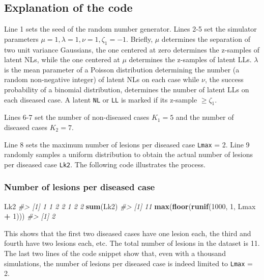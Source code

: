 \documentclass[
]{book}
\newenvironment{Shaded}{\begin{snugshade}}{\end{snugshade}}
\newcommand{\CommentTok}[1]{\textcolor[rgb]{0.56,0.35,0.01}{\textit{#1}}}
\newcommand{\DecValTok}[1]{\textcolor[rgb]{0.00,0.00,0.81}{#1}}
\newcommand{\KeywordTok}[1]{\textcolor[rgb]{0.13,0.29,0.53}{\textbf{#1}}}
\newcommand{\NormalTok}[1]{#1}
\newcommand{\OperatorTok}[1]{\textcolor[rgb]{0.81,0.36,0.00}{\textbf{#1}}}
\newcommand{\StringTok}[1]{\textcolor[rgb]{0.31,0.60,0.02}{#1}}
\begin{document}
\hypertarget{explanation-of-the-code}{%
\subsection{Explanation of the code}\label{explanation-of-the-code}}

Line 1 sets the seed of the random number generator. Lines 2-5 set the simulator parameters \(\mu = 1, \lambda = 1, \nu = 1, \zeta_1 = -1\). Briefly, \(\mu\) determines the separation of two unit variance Gaussians, the one centered at zero determines the z-samples of latent NLs, while the one centered at \(\mu\) determines the z-samples of latent LLs. \(\lambda\) is the mean parameter of a Poisson distribution determining the number (a random non-negative integer) of latent NLs on each case while \(\nu\), the success probability of a binomial distribution, determines the number of latent LLs on each diseased case. A latent \texttt{NL} or \texttt{LL} is marked if its z-sample \(\geq \zeta_1\).

Lines 6-7 set the number of non-diseased cases \(K_1 = 5\) and the number of diseased cases \(K_2 = 7\).

Line 8 sets the maximum number of lesions per diseased case \texttt{Lmax} = 2. Line 9 randomly samples a uniform distribution to obtain the actual number of lesions per diseased case \texttt{Lk2}. The following code illustrates the process.

\hypertarget{number-of-lesions-per-diseased-case}{%
\subsubsection{Number of lesions per diseased case}\label{number-of-lesions-per-diseased-case}}

\begin{Shaded}
\begin{Highlighting}[]
\NormalTok{Lk2}
\CommentTok{#> [1] 1 1 2 2 1 2 2}
\KeywordTok{sum}\NormalTok{(Lk2)}
\CommentTok{#> [1] 11}
\KeywordTok{max}\NormalTok{(}\KeywordTok{floor}\NormalTok{(}\KeywordTok{runif}\NormalTok{(}\DecValTok{1000}\NormalTok{, }\DecValTok{1}\NormalTok{, Lmax }\OperatorTok{+}\StringTok{ }\DecValTok{1}\NormalTok{)))}
\CommentTok{#> [1] 2}
\end{Highlighting}
\end{Shaded}

This shows that the first two diseased cases have one lesion each, the third and fourth have two lesions each, etc. The total number of lesions in the dataset is 11. The last two lines of the code snippet show that, even with a thousand simulations, the number of lesions per diseased case is indeed limited to \texttt{Lmax} = 2.
\end{document}
